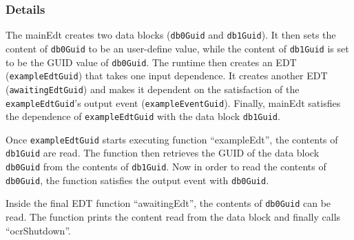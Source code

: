 \subsubsection{Details}

The mainEdt creates two data blocks ({\tt db0Guid} and {\tt db1Guid}).
It then sets the content of {\tt db0Guid} to be an user-define value,
while the content of {\tt db1Guid} is set to be the GUID value of {\tt db0Guid}.
The runtime then creates an EDT ({\tt exampleEdtGuid}) that takes one input dependence.
It creates another EDT ({\tt awaitingEdtGuid}) and makes it dependent on the satisfaction of the {\tt exampleEdtGuid}'s output event ({\tt exampleEventGuid}).
Finally, mainEdt satisfies the dependence of {\tt exampleEdtGuid} with the data block {\tt db1Guid}.

Once {\tt exampleEdtGuid} starts executing function ``exampleEdt'', the contents of {\tt db1Guid} are read.
The function then retrieves the GUID of the data block {\tt db0Guid} from the contents of {\tt db1Guid}.
Now in order to read the contents of {\tt db0Guid}, the function satisfies the output event with {\tt db0Guid}.

Inside the final EDT function ``awaitingEdt'', the contents of {\tt db0Guid} can be read.
The function prints the content read from the data block and finally calls ``ocrShutdown''.
